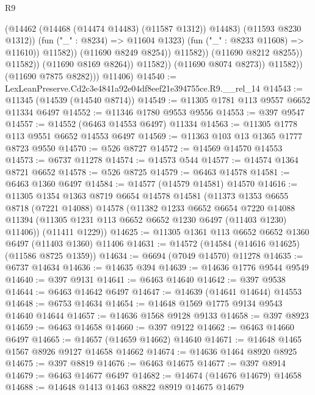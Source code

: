 \begin{lexlean}{R9}
\begin{coremodule}
                                          (@14462 (@14468 (@14474 @14483) (@11587 @1312)) @14483)
                                          (@11593 @8230 @1312))
                                        (fun ("_" : @8234) => @11604 @1323)
                                        (fun ("_" : @8233 @11608) => @11610))
                                      @11582))
                                  (@11690 @8249 @8254))
                                @11582))
                            (@11690 @8212 @8255))
                          @11582))
                      (@11690 @8169 @8264))
                    @11582))
                (@11690 @8074 @8273))
              @11582))
          (@11690 @7875 @8282)))
      @11406)
@14540 := LexLeanPreserve.Cd2c3e4841a92e04df8eef21e394755ce.R9.__rel_14
@14543 := @11345 (@14539 (@14540 @8714))
@14549 := @11305 @1781 @113 @9557 @6652 @11334 @6497
@14552 := @11346 @1780 @9553 @9556
@14553 := @397 @9547
@14557 := @14552 (@6463 @14553 @6497) @11334
@14563 := @11305 @1778 @113 @9551 @6652 @14553 @6497
@14569 := @11363 @103 @13 @1365 @1777 @8723 @9550
@14570 := @526 @8727
@14572 := @14569 @14570 @14553
@14573 := @6737 @11278
@14574 := @14573 @544
@14577 := @14574 @1364 @8721 @6652
@14578 := @526 @8725
@14579 := @6463 @14578
@14581 := @6463 @1360 @6497
@14584 := @14577 (@14579 @14581) @14570
@14616 := @11305
    @1354
    @1363
    @8719
    @6654
    @14578
    @14581
    (@11373
      @1353
      @6655
      @8718
      (@7221 @14088)
      @14578
      (@11382
        @1233
        @6652
        @6654
        @7220
        @14088
        @11394
        (@11305 @1231 @113 @6652 @6652 @1230 @6497 (@11403 @1230) @11406))
      (@11411 @1229))
@14625 := @11305 @1361 @113 @6652 @6652 @1360 @6497 (@11403 @1360) @11406
@14631 := @14572 (@14584 (@14616 @14625) (@11586 @8725 @1359))
@14634 := @6694 (@7049 @14570) @11278
@14635 := @6737 @14634
@14636 := @14635 @394
@14639 := @14636 @1776 @9544 @9549
@14640 := @397 @9131
@14641 := @6463 @14640
@14642 := @397 @9538
@14644 := @6463 @14642 @6497
@14647 := @14639 (@14641 @14644) @14553
@14648 := @6753 @14634
@14654 := @14648 @1569 @1775 @9134 @9543 @14640 @14644
@14657 := @14636 @1568 @9128 @9133
@14658 := @397 @8923
@14659 := @6463 @14658
@14660 := @397 @9122
@14662 := @6463 @14660 @6497
@14665 := @14657 (@14659 @14662) @14640
@14671 := @14648 @1465 @1567 @8926 @9127 @14658 @14662
@14674 := @14636 @1464 @8920 @8925
@14675 := @397 @8819
@14676 := @6463 @14675
@14677 := @397 @8914
@14679 := @6463 @14677 @6497
@14682 := @14674 (@14676 @14679) @14658
@14688 := @14648 @1413 @1463 @8822 @8919 @14675 @14679

\end{coremodule}
\end{lexlean}
